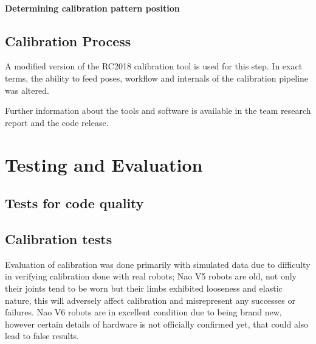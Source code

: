 \documentclass[english, printversion, nomenclature, notitle]{tuvisionthesis} %
\begin{document}

\subsubsection{Determining calibration pattern position}

\section{Calibration Process}
A modified version of the RC2018 calibration tool is used for this step. In exact terms, the ability to feed poses, workflow and internals of the calibration pipeline was altered.

Further information about the tools and software is available in the team research report and the code release. 


\chapter{Testing and Evaluation}

\section{Tests for code quality}
\section{Calibration tests}

Evaluation of calibration was done primarily with simulated data due to difficulty in verifying calibration done with real robots; Nao V5 robots are old, not only their joints tend to be worn but their limbs exhibited looseness and elastic nature, this will adversely affect calibration and misrepresent any successes or failures. Nao V6 robots are in excellent condition due to being brand new, however certain details of hardware is not officially confirmed yet, that could also lead to false results.
\end{document}
